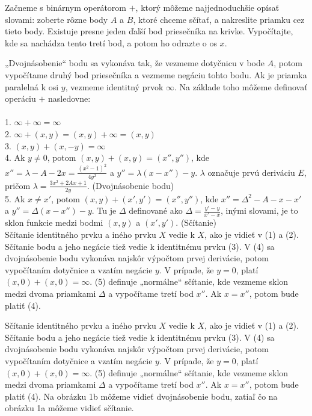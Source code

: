 Začneme s binárnym operátorom \( + \), ktorý môžeme najjednoduchšie opísať slovami: zoberte rôzne body \( A \) a \( B \), ktoré chceme sčítať, a nakreslite priamku cez tieto body. Existuje presne jeden ďalší bod priesečníka na krivke. Vypočítajte, kde sa nachádza tento tretí bod, a potom ho odrazte o os \( x \). 

„Dvojnásobenie“ bodu sa vykonáva tak, že vezmeme dotyčnicu v bode \( A \), potom vypočítame druhý bod priesečníka a vezmeme negáciu tohto bodu. Ak je priamka paralelná k osi \( y \), vezmeme identitný prvok \( \infty \). Na základe toho môžeme definovať operáciu \( + \) nasledovne: \\ \\
1. \( \infty + \infty = \infty \) \\
2. \( \infty + (x, y) = (x, y) + \infty = (x, y) \) \\
3. \( (x, y) + (x, -y) = \infty \) \\
4. Ak \( y \neq 0 \), potom \( (x, y) + (x, y) = (x'', y'') \), kde \( x'' = \lambda - A - 2x = \frac{(x^2 - 1)^2}{4y^2} \) a \( y'' = \lambda(x - x'') - y \). \( \lambda \) označuje prvú deriváciu \( E \), pričom \( \lambda = \frac{3x^2 + 2Ax + 1}{2y} \). (Dvojnásobenie bodu) \\
5. Ak \( x \neq x' \), potom \( (x, y) + (x', y') = (x'', y'') \), kde \( x'' = \Delta^2 - A - x - x' \) a \( y'' = \Delta(x - x'') - y \). Tu je \( \Delta \) definované ako \( \Delta = \frac{y' - y}{x' - x} \), inými slovami, je to sklon funkcie medzi bodmi \( (x, y) \) a \( (x', y') \). (Sčítanie) \\

Sčítanie identitného prvku a iného prvku \( X \) vedie k \( X \), ako je vidieť v (1) a (2). Sčítanie bodu a jeho negácie tiež vedie k identitnému prvku (3). V (4) sa dvojnásobenie bodu vykonáva najskôr výpočtom prvej derivácie, potom vypočítaním dotyčnice a vzatím negácie \( y \). V prípade, že \( y = 0 \), platí \( (x, 0) + (x, 0) = \infty \). (5) definuje „normálne“ sčítanie, kde vezmeme sklon medzi dvoma priamkami \( \Delta \) a vypočítame tretí bod \( x'' \). Ak \( x = x'' \), potom bude platiť (4). 


Sčítanie identitného prvku a iného prvku \( X \) vedie k \( X \), ako je vidieť v (1) a (2). Sčítanie bodu a jeho negácie tiež vedie k identitnému prvku (3). V (4) sa dvojnásobenie bodu vykonáva najskôr výpočtom prvej derivácie, potom vypočítaním dotyčnice a vzatím negácie \( y \). V prípade, že \( y = 0 \), platí \( (x, 0) + (x, 0) = \infty \). (5) definuje „normálne“ sčítanie, kde vezmeme sklon medzi dvoma priamkami \( \Delta \) a vypočítame tretí bod \( x'' \). Ak \( x = x'' \), potom bude platiť (4). Na obrázku 1b môžeme vidieť dvojnásobenie bodu, zatiaľ čo na obrázku 1a môžeme vidieť sčítanie.

